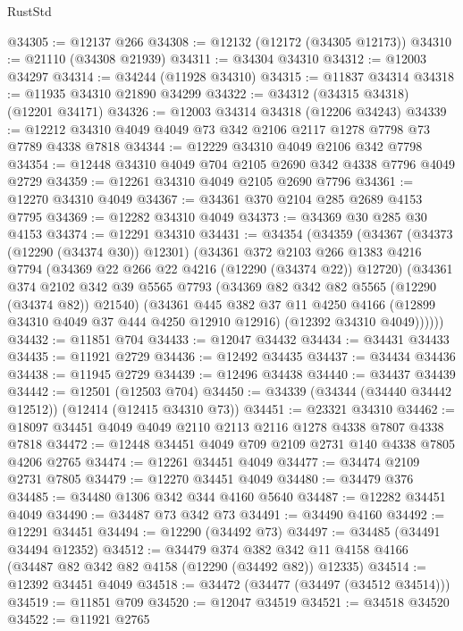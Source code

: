 \begin{lexlean}{RustStd}
\begin{coremodule}
{\begin{coremodule}
{{{{{{{{{{{{{{{{{{{{{{{{{{{{{{{{{{{{{{{{{{{{{{{{{{@34305 := @12137 @266
@34308 := @12132 (@12172 (@34305 @12173))
@34310 := @21110 (@34308 @21939)
@34311 := @34304 @34310
@34312 := @12003 @34297
@34314 := @34244 (@11928 @34310)
@34315 := @11837 @34314
@34318 := @11935 @34310 @21890 @34299
@34322 := @34312 (@34315 @34318) (@12201 @34171)
@34326 := @12003 @34314 @34318 (@12206 @34243)
@34339 := @12212 @34310 @4049 @4049 @73 @342 @2106 @2117 @1278 @7798 @73 @7789 @4338 @7818
@34344 := @12229 @34310 @4049 @2106 @342 @7798
@34354 := @12448 @34310 @4049 @704 @2105 @2690 @342 @4338 @7796 @4049 @2729
@34359 := @12261 @34310 @4049 @2105 @2690 @7796
@34361 := @12270 @34310 @4049
@34367 := @34361 @370 @2104 @285 @2689 @4153 @7795
@34369 := @12282 @34310 @4049
@34373 := @34369 @30 @285 @30 @4153
@34374 := @12291 @34310
@34431 := @34354
    (@34359
      (@34367
        (@34373 (@12290 (@34374 @30)) @12301)
        (@34361
          @372
          @2103
          @266
          @1383
          @4216
          @7794
          (@34369 @22 @266 @22 @4216 (@12290 (@34374 @22)) @12720)
          (@34361
            @374
            @2102
            @342
            @39
            @5565
            @7793
            (@34369 @82 @342 @82 @5565 (@12290 (@34374 @82)) @21540)
            (@34361
              @445
              @382
              @37
              @11
              @4250
              @4166
              (@12899 @34310 @4049 @37 @444 @4250 @12910 @12916)
              (@12392 @34310 @4049))))))
@34432 := @11851 @704
@34433 := @12047 @34432
@34434 := @34431 @34433
@34435 := @11921 @2729
@34436 := @12492 @34435
@34437 := @34434 @34436
@34438 := @11945 @2729
@34439 := @12496 @34438
@34440 := @34437 @34439
@34442 := @12501 (@12503 @704)
@34450 := @34339 (@34344 (@34440 @34442 @12512)) (@12414 (@12415 @34310 @73))
@34451 := @23321 @34310
@34462 := @18097 @34451 @4049 @4049 @2110 @2113 @2116 @1278 @4338 @7807 @4338 @7818
@34472 := @12448 @34451 @4049 @709 @2109 @2731 @140 @4338 @7805 @4206 @2765
@34474 := @12261 @34451 @4049
@34477 := @34474 @2109 @2731 @7805
@34479 := @12270 @34451 @4049
@34480 := @34479 @376
@34485 := @34480 @1306 @342 @344 @4160 @5640
@34487 := @12282 @34451 @4049
@34490 := @34487 @73 @342 @73
@34491 := @34490 @4160
@34492 := @12291 @34451
@34494 := @12290 (@34492 @73)
@34497 := @34485 (@34491 @34494 @12352)
@34512 := @34479
    @374
    @382
    @342
    @11
    @4158
    @4166
    (@34487 @82 @342 @82 @4158 (@12290 (@34492 @82)) @12335)
@34514 := @12392 @34451 @4049
@34518 := @34472 (@34477 (@34497 (@34512 @34514)))
@34519 := @11851 @709
@34520 := @12047 @34519
@34521 := @34518 @34520
@34522 := @11921 @2765
}}}}}}}}}}}}}}}}}}}}}}}}}}}}}}}}}}}}}}}}}}}}}}}}}}
\end{coremodule}}
\end{coremodule}
\end{lexlean}

